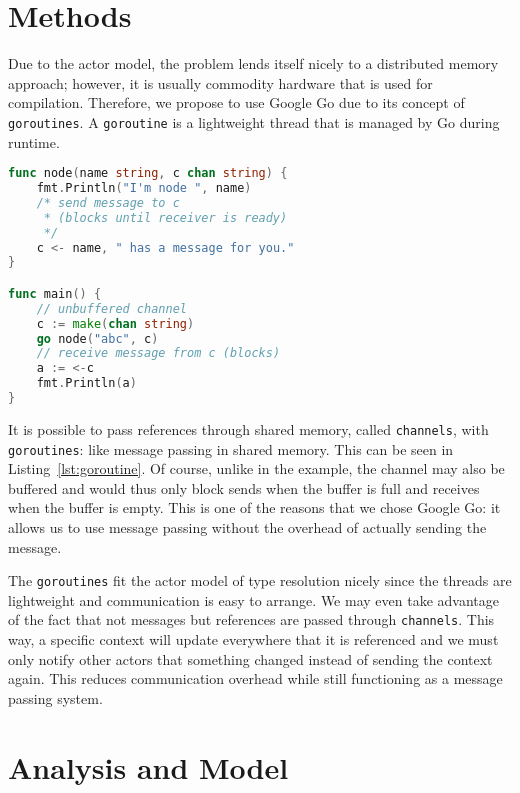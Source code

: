 \documentclass{acm_proc_article-sp}
\begin{document}
\section{Methods}


Due to the actor model, the problem lends itself nicely to a distributed memory
approach; however, it is usually commodity hardware that is used for
compilation. Therefore, we propose to use Google Go due to its concept of
\texttt{goroutines}. A \texttt{goroutine} is a lightweight thread that is
managed by Go during runtime. 

\begin{lstlisting}[caption=Small \texttt{goroutine} example with
\texttt{channels},language=Go,label=lst:goroutine]
func node(name string, c chan string) {
	fmt.Println("I'm node ", name)
	/* send message to c 
	 * (blocks until receiver is ready)
	 */
	c <- name, " has a message for you."
}

func main() {
	// unbuffered channel
	c := make(chan string)
	go node("abc", c)
	// receive message from c (blocks)
	a := <-c
	fmt.Println(a)
}
\end{lstlisting}

It is possible to pass references through shared memory, called
\texttt{channels}, with \texttt{goroutines}: like message passing in shared
memory. This can be seen in Listing~\ref{lst:goroutine}. Of course, unlike in
the example, the channel may also be buffered and would thus only block sends
when the buffer is full and receives when the buffer is empty. This is one of
the reasons that we chose Google Go: it allows us to use message passing
without the overhead of actually sending the message.

The \texttt{goroutines} fit the actor model of type resolution nicely since
the threads are lightweight and communication is easy to arrange. We may even
take advantage of the fact that not messages but references are passed through
\texttt{channels}. This way, a specific context will update everywhere that it
is referenced and we must only notify other actors that something changed
instead of sending the context again. This reduces communication overhead while
still functioning as a message passing system.

\section{Analysis and Model}

\end{document}
